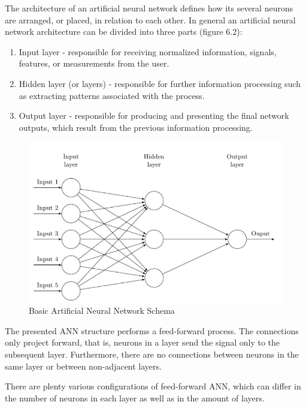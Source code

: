 The architecture of an artificial neural network defines how its several neurons are arranged, or placed, in relation to each other. In general an artificial neural network architecture can be divided into three parts (figure 6.2):

\begin{enumerate}
\itemsep0em 
\item Input layer - responsible for receiving normalized information, signals, features, or measurements from the user.
\item Hidden layer (or layers) - responsible for further information processing such as extracting patterns associated with the process. 
\item Output layer - responsible for producing and presenting the final network outputs, which result from the previous information processing.
\end{enumerate}

\begin{figure}[H]
\centering
\includegraphics[scale=0.65]{ANN_schema.jpg}
\caption{Basic Artificial Neural Network Schema}
\end{figure} 

The presented ANN structure performs a feed-forward process. The connections only project forward, that is, neurons in a layer send the signal only to the subsequent layer. Furthermore, there are no connections between neurons in the same layer or between non-adjacent layers. 

There are plenty various configurations of feed-forward ANN, which can differ in the number of neurons in each layer as well as in the amount of layers. 


